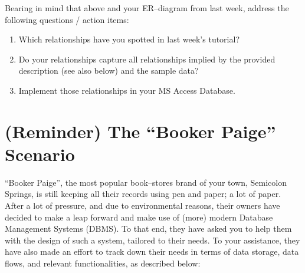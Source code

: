 \documentclass[a4paper, 10pt]{article}
\begin{document}
	Bearing in mind that above and your ER--diagram from last week, address the following questions / action items:
	\begin{enumerate}
		\item Which relationships have you spotted in last week's tutorial?
		\item Do your relationships capture all relationships implied by the provided description (see also below) and the sample data?
		\item Implement those relationships in your MS Access Database.
	\end{enumerate}
	\section*{(Reminder) The ``Booker Paige'' Scenario}\label{sec:The ``Booker Paige'' Scenario}
	``Booker Paige'', the most popular book--stores brand of your town, Semicolon Springs, is still keeping all their records using pen and paper; a lot of paper. After a lot of pressure, and due to environmental reasons, their owners have decided to make a leap forward and make use of (more) modern Database Management Systems (DBMS). To that end, they have asked you to help them with the design of such a system, tailored to their needs. To your assistance, they have also made an effort to track down their needs in terms of data storage, data flows, and relevant functionalities, as described below:
	
\end{document}
